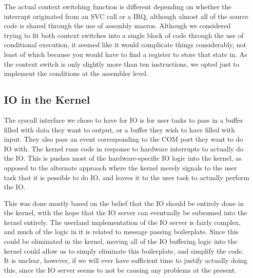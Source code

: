 \documentclass[titlepage]{article}
\begin{document}
The actual context switching function is different depending on whether the
interrupt originated from an SVC call or a IRQ, although almost all of the
source code is shared through the use of assembly macros. Although we considered
trying to fit both context switches into a single block of code through the use
of conditional execution, it seemed like it would complicate things
considerably, not least of which because you would have to find a register to
store that state in. As the context switch is only slightly more than ten
instructions, we opted just to implement the conditions at the assembler level.



\subsection{IO in the Kernel}
The syscall interface we chose to have for IO is for user tasks to pass in a buffer
filled with data they want to output, or a buffer they wish to have filled with input.
They also pass an event corresponding to the COM port they want to do IO with.
The kernel runs code in response to hardware interrupts to actually do the IO.
This is pushes most of the hardware-specific IO logic into the kernel, as opposed to
the alternate approach where the kernel merely signals to the user task that it is possible
to do IO, and leaves it to the user task to actually perform the IO.

This was done mostly based on the belief that the IO should be entirely done in the kernel,
with the hope that the IO server can eventually be subsumed into the kernel entirely.
The userland implementation of the IO server is fairly complex, and much of the logic
in it is related to message passing boilerplate.
Since this could be eliminated in the kernel, moving all of the IO buffering logic
into the kernel could allow us to simply eliminate this boilerplate, and simplify the code.
It is unclear, however, if we will ever have sufficient time to justify actually doing
this, since the IO server seems to not be causing any problems at the present.
\end{document}

